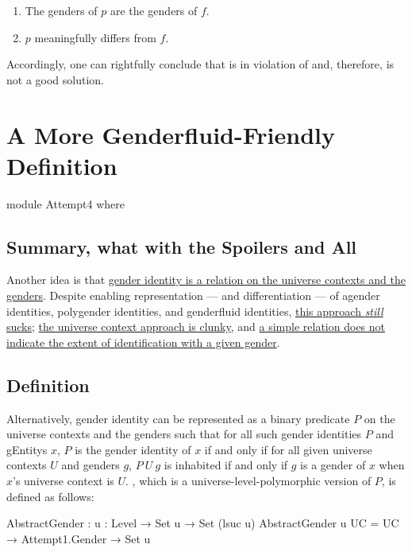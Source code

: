 \documentclass{article}
\theoremstyle{remark}
\newcommand{\summaryLink}[2]{\hyperref[#1]{#2}}
\begin{document}
\begin{enumerate}
  \item The genders of \(p\) are the genders of \(f\).
  \item \(p\) meaningfully differs from \(f\).
\end{enumerate}

Accordingly, one can rightfully conclude that  is in violation of  and, therefore, is not a good solution.

\section{A More Genderfluid-Friendly Definition}

\begin{code}
module Attempt4 where
\end{code}

\subsection{Summary, what with the Spoilers and All}
Another idea is that \summaryLink{sec:gender4definition}{gender identity is a relation on the universe contexts and the genders}.  Despite enabling representation --- and differentiation --- of agender identities, polygender identities, and genderfluid identities, \summaryLink{sec:gender4flaws}{this approach \emph{still} sucks}; \summaryLink{enum:gender4flawsClunky}{the universe context approach is clunky}, and \summaryLink{enum:gender4flawsExtent}{a simple relation does not indicate the extent of identification with a given gender}.

\subsection{Definition}\label{sec:gender4definition}
Alternatively, gender identity can be represented as a binary predicate \(P\) on the universe contexts and the genders such that for all such gender identities \(P\) and \glspl{gEntity} \(x\), \(P\) is the gender identity of \(x\) if and only if for all given universe contexts \(U\) and genders \(g\), \(P\ U\ g\) is inhabited if and only if \(g\) is a gender of \(x\) when \(x\)'s universe context is \(U\).  , which is a universe-level-polymorphic version of \(P\), is defined as follows:

\begin{code}
  AbstractGender : {u : Level} → Set u → Set (lsuc u)
  AbstractGender {u} UC = UC → Attempt1.Gender → Set u
\end{code}
\end{document}

